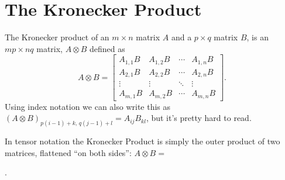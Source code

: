 \section{The Kronecker Product}
The Kronecker product of an $m\times n$ matrix $A$ and a $p \times q$ matrix $B$, is an $mp \times nq$ matrix, $A \otimes B$ defined as
\[
   \renewcommand*{\arraystretch}{1.3}
   A \otimes B = \begin{bmatrix}
      A_{1,1} B & A_{1,2} B & \cdots & A_{1,n} B \\
      A_{2,1} B & A_{2,2} B & \cdots & A_{2,n} B \\
      \vdots & \vdots & \ddots & \vdots \\
      A_{m,1} B & A_{m,2} B & \cdots & A_{m,n} B
   \end{bmatrix}
   .
\]
Using index notation we can also write this as
$(A\otimes B)_{p(i-1)+k,\, q(j-1)+l} = A_{ij} B_{kl}$, but it's pretty hard to read.

In tensor notation the Kronecker Product is simply the outer product of two matrices, flattened ``on both sides'':
$A\otimes B=$
.

